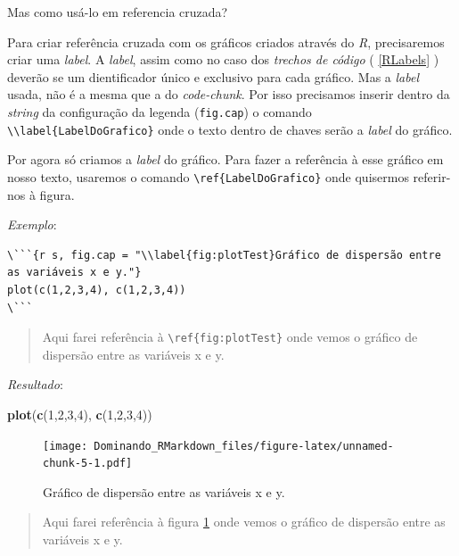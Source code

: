 \documentclass[]{book}
\newenvironment{Shaded}{\begin{snugshade}}{\end{snugshade}}
\newcommand{\DecValTok}[1]{\textcolor[rgb]{0.00,0.00,0.81}{#1}}
\newcommand{\KeywordTok}[1]{\textcolor[rgb]{0.13,0.29,0.53}{\textbf{#1}}}
\newcommand{\NormalTok}[1]{#1}
\begin{document}
Mas como usá-lo em referencia cruzada?

Para criar referência cruzada com os gráficos criados através do \emph{R}, precisaremos criar uma \emph{label}. A \emph{label}, assim como no caso dos \emph{trechos de código} ( \ref{RLabels} ) deverão se um dientificador único e exclusivo para cada gráfico. Mas a \emph{label} usada, não é a mesma que a do \emph{code-chunk}. Por isso precisamos inserir dentro da \emph{string} da configuração da legenda (\texttt{fig.cap}) o comando \texttt{\textbackslash{}\textbackslash{}label\{LabelDoGrafico\}} onde o texto dentro de chaves serão a \emph{label} do gráfico.

Por agora só criamos a \emph{label} do gráfico. Para fazer a referência à esse gráfico em nosso texto, usaremos o comando \texttt{\textbackslash{}ref\{LabelDoGrafico\}} onde quisermos referir-nos à figura.

\emph{Exemplo}:

\begin{verbatim}
\```{r s, fig.cap = "\\label{fig:plotTest}Gráfico de dispersão entre as variáveis x e y."}
plot(c(1,2,3,4), c(1,2,3,4))
\```
\end{verbatim}

\begin{quote}
Aqui farei referência à \texttt{\textbackslash{}ref\{fig:plotTest\}} onde vemos o gráfico de dispersão entre as variáveis x e y.
\end{quote}

\emph{Resultado}:

\begin{Shaded}
\begin{Highlighting}[]
\KeywordTok{plot}\NormalTok{(}\KeywordTok{c}\NormalTok{(}\DecValTok{1}\NormalTok{,}\DecValTok{2}\NormalTok{,}\DecValTok{3}\NormalTok{,}\DecValTok{4}\NormalTok{), }\KeywordTok{c}\NormalTok{(}\DecValTok{1}\NormalTok{,}\DecValTok{2}\NormalTok{,}\DecValTok{3}\NormalTok{,}\DecValTok{4}\NormalTok{))}
\end{Highlighting}
\end{Shaded}

\begin{figure}
\centering
\texttt{[image: Dominando\_RMarkdown\_files/figure-latex/unnamed-chunk-5-1.pdf]}
\caption{\label{fig:unnamed-chunk-5}\label{fig:plotTest}Gráfico de dispersão entre as variáveis x e y.}
\end{figure}

\begin{quote}
Aqui farei referência à figura \ref{fig:plotTest} onde vemos o gráfico de dispersão entre as variáveis x e y.
\end{quote}
\end{document}
